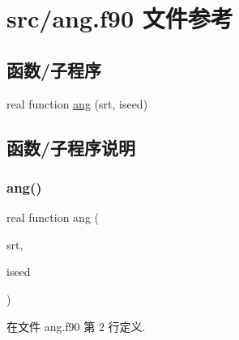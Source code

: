 \hypertarget{ang_8f90}{}\section{src/ang.f90 文件参考}
\label{ang_8f90}
\subsection*{函数/子程序}
\begin{DoxyCompactItemize}
\item 
real function \mbox{\hyperlink{ang_8f90_acea5ff8ca44ed9803ba45568dc380dd2}{ang}} (srt, iseed)
\end{DoxyCompactItemize}


\subsection{函数/子程序说明}
\mbox{\label{ang_8f90_acea5ff8ca44ed9803ba45568dc380dd2}} 
\subsubsection{\texorpdfstring{ang()}{ang()}}
{\footnotesize\ttfamily real function ang (\begin{DoxyParamCaption}\item[{}]{srt,  }\item[{}]{iseed }\end{DoxyParamCaption})}



在文件 ang.\+f90 第 2 行定义.

